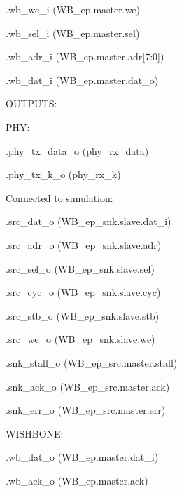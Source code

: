 \begin{dig}
\begin{dig}
\begin{dig}
\begin{dig}
            \item .wb\_we\_i                    (WB\_ep.master.we)
            \item .wb\_sel\_i                   (WB\_ep.master.sel)
            \item .wb\_adr\_i                   (WB\_ep.master.adr[7:0])
            \item .wb\_dat\_i                   (WB\_ep.master.dat\_o)
            \end{dig}
        \end{dig}
    \item OUTPUTS:
        \begin{dig}
        \item PHY:
            \begin{dig}
            \item .phy\_tx\_data\_o              (phy\_rx\_data)
            \item .phy\_tx\_k\_o                 (phy\_rx\_k)
            \end{dig}
        \item Connected to simulation:
            \begin{dig}
            \item .src\_dat\_o                  (WB\_ep\_snk.slave.dat\_i)
            \item .src\_adr\_o                  (WB\_ep\_snk.slave.adr)
            \item .src\_sel\_o                  (WB\_ep\_snk.slave.sel)
            \item .src\_cyc\_o                  (WB\_ep\_snk.slave.cyc)
            \item .src\_stb\_o                  (WB\_ep\_snk.slave.stb)
            \item .src\_we\_o                   (WB\_ep\_snk.slave.we)
            \item 
            \item .snk\_stall\_o                (WB\_ep\_src.master.stall)
            \item .snk\_ack\_o                  (WB\_ep\_src.master.ack)
            \item .snk\_err\_o                  (WB\_ep\_src.master.err)
            \end{dig}
        \item WISHBONE:
            \begin{dig}
            \item .wb\_dat\_o                   (WB\_ep.master.dat\_i)
            \item .wb\_ack\_o                   (WB\_ep.master.ack)

\end{dig}
\end{dig}
\end{dig}
\end{dig}
